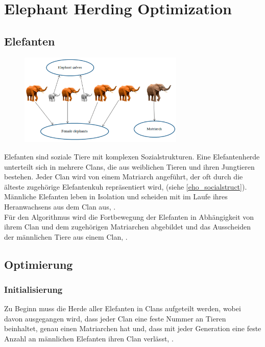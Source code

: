 \chapter{Elephant Herding Optimization}

\section{Elefanten} 
\begin{figure}[ht]
    \begin{center}
        \includegraphics[width=0.7\textwidth]{assets/img/eho_socialstruct.png}
        \caption[EHO Social Structure in a clan]{\cite[Li et al, S.3]{li_lei_alavi_wang_2020}}
        \label{eho_socialstruct}
    \end{center}
\end{figure}
Elefanten sind soziale Tiere mit komplexen Sozialstrukturen. Eine Elefantenherde unterteilt sich in mehrere Clans, die aus weiblichen Tieren und ihren Jungtieren bestehen. Jeder Clan wird von einem Matriarch angeführt, der oft durch die älteste zugehörige Elefantenkuh repräsentiert wird, (siehe \autoref{eho_socialstruct}). Männliche Elefanten leben in Isolation und scheiden mit im Laufe ihres Heranwachsens aus dem Clan aus, \cite[vgl. Wang et al. 2015, S.1]{wang_deb_coelho_2015}. \\
Für den Algorithmus wird die Fortbewegung der Elefanten in Abhängigkeit von ihrem Clan und dem zugehörigen Matriarchen abgebildet und das Ausscheiden der männlichen Tiere aus einem Clan, \cite[vgl. Wang et al, S.1]{wang_deb_coelho_2015}. 

\section{Optimierung}

\subsection{Initialisierung}
Zu Beginn muss die Herde aller Elefanten in Clans aufgeteilt werden, wobei davon ausgegangen wird, dass jeder Clan eine feste Nummer an Tieren beinhaltet, genau einen Matriarchen hat und, dass mit jeder Generation eine feste Anzahl an männlichen Elefanten ihren Clan verlässt, \cite[vgl. Wang et al, S.2]{wang_deb_coelho_2015}. 

